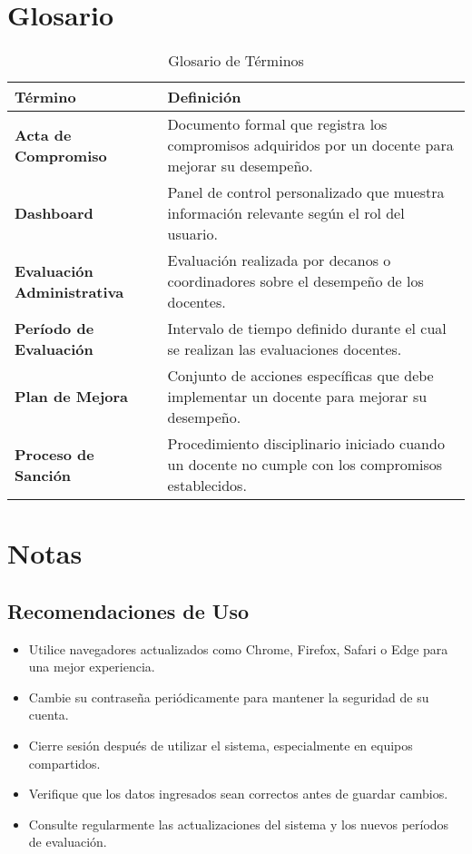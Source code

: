\documentclass[12pt,a4paper]{article}
\begin{document}
\section{Glosario}\label{sec:glosario}
\begin{table}[H]
  \centering
  \caption{Glosario de Términos}\label{tab:glosario}
  \begin{tabularx}{\textwidth}{>{\bfseries}lX}
    \toprule
    Término & Definición \\
    \midrule
    Acta de Compromiso & Documento formal que registra los compromisos adquiridos por un docente para mejorar su desempeño. \\
    Dashboard & Panel de control personalizado que muestra información relevante según el rol del usuario. \\
    Evaluación Administrativa & Evaluación realizada por decanos o coordinadores sobre el desempeño de los docentes. \\
    Período de Evaluación & Intervalo de tiempo definido durante el cual se realizan las evaluaciones docentes. \\
    Plan de Mejora & Conjunto de acciones específicas que debe implementar un docente para mejorar su desempeño. \\
    Proceso de Sanción & Procedimiento disciplinario iniciado cuando un docente no cumple con los compromisos establecidos. \\
    \bottomrule
  \end{tabularx}
\end{table}

\section{Notas}\label{sec:notas}
\subsection{Recomendaciones de Uso}
\begin{itemize}
    \item Utilice navegadores actualizados como Chrome, Firefox, Safari o Edge para una mejor experiencia.
    \item Cambie su contraseña periódicamente para mantener la seguridad de su cuenta.
    \item Cierre sesión después de utilizar el sistema, especialmente en equipos compartidos.
    \item Verifique que los datos ingresados sean correctos antes de guardar cambios.
    \item Consulte regularmente las actualizaciones del sistema y los nuevos períodos de evaluación.
\end{itemize}
\end{document}
